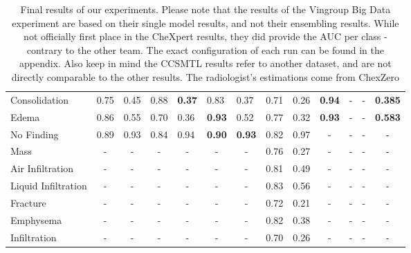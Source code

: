 \documentclass[11pt]{article}
\begin{document}
\begin{landscape}
\begin{table}[]
\begin{tabular}{@{}lllllllllcccc@{}}
Consolidation &
  0.75 &
  0.45 &
  0.88 &
  \textbf{0.37} &
  0.83 &
  0.37 &
  0.71 &
  0.26 &
  \multicolumn{1}{l}{\textbf{0.94}} &
  - &
  - &
  \multicolumn{1}{l}{\textbf{0.385}} \\
Edema &
  0.86 &
  0.55 &
  0.70 &
  0.36 &
  \textbf{0.93} &
  0.52 &
  0.77 &
  0.32 &
  \multicolumn{1}{l}{\textbf{0.93}} &
  - &
  - &
  \multicolumn{1}{l}{\textbf{0.583}} \\
No Finding &
  0.89 &
  0.93 &
  0.84 &
  0.94 &
  \textbf{0.90} &
  \textbf{0.93} &
  0.82 &
  0.97 &
  - &
  - &
  - &
  - \\ \midrule
Mass &
  \multicolumn{1}{c}{-} &
  \multicolumn{1}{c}{-} &
  \multicolumn{1}{c}{-} &
  \multicolumn{1}{c}{-} &
  \multicolumn{1}{c}{-} &
  \multicolumn{1}{c}{-} &
  0.76 &
  0.27 &
  - &
  - &
  - &
  - \\
Air Infiltration &
  \multicolumn{1}{c}{-} &
  \multicolumn{1}{c}{-} &
  \multicolumn{1}{c}{-} &
  \multicolumn{1}{c}{-} &
  \multicolumn{1}{c}{-} &
  \multicolumn{1}{c}{-} &
  0.81 &
  0.49 &
  - &
  - &
  - &
  - \\
Liquid Infiltration &
  \multicolumn{1}{c}{-} &
  \multicolumn{1}{c}{-} &
  \multicolumn{1}{c}{-} &
  \multicolumn{1}{c}{-} &
  \multicolumn{1}{c}{-} &
  \multicolumn{1}{c}{-} &
  0.83 &
  0.56 &
  - &
  - &
  - &
  - \\
Fracture &
  \multicolumn{1}{c}{-} &
  \multicolumn{1}{c}{-} &
  \multicolumn{1}{c}{-} &
  \multicolumn{1}{c}{-} &
  \multicolumn{1}{c}{-} &
  \multicolumn{1}{c}{-} &
  0.72 &
  0.21 &
  - &
  - &
  - &
  - \\
Emphysema &
  \multicolumn{1}{c}{-} &
  \multicolumn{1}{c}{-} &
  \multicolumn{1}{c}{-} &
  \multicolumn{1}{c}{-} &
  \multicolumn{1}{c}{-} &
  \multicolumn{1}{c}{-} &
  0.82 &
  0.38 &
  - &
  - &
  - &
  - \\
Infiltration &
  \multicolumn{1}{c}{-} &
  \multicolumn{1}{c}{-} &
  \multicolumn{1}{c}{-} &
  \multicolumn{1}{c}{-} &
  \multicolumn{1}{c}{-} &
  \multicolumn{1}{c}{-} &
  0.70 &
  0.26 &
  - &
  - &
  - &
  -
\end{tabular}
    \label{tab:final_results}
    \caption{Final results of our experiments. Please note that the results of the Vingroup Big Data experiment are based on their single model results, and not their ensembling results. While not officially first
    place in the CheXpert results, they did provide the AUC per class - contrary to the other team. The exact configuration of each run can be found in the appendix. Also keep in mind the CCSMTL results refer
    to another dataset, and are not directly comparable to the other results. The radiologist's estimations come from ChexZero\cite{chexzero}}
\end{table}
\end{landscape}
\end{document}
